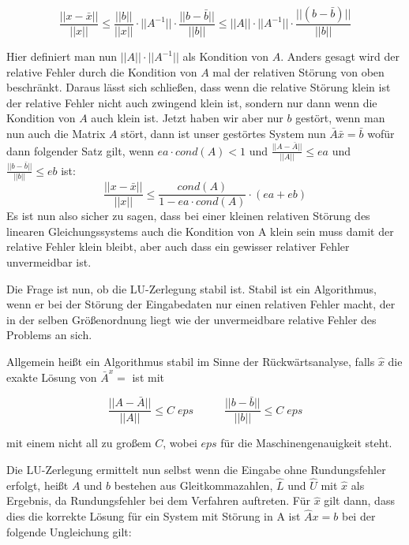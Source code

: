 \documentclass[course=erap]{aspdoc}
\begin{document}
\begin{equation}
\label{norm}
\frac{||x- \bar{x}||}{||x||}   \leq    \frac{||b||} {||x||} \cdot ||A^{-1}|| \cdot \frac{||b-\bar{b}||}{||b||} \leq ||A|| \cdot ||A^{-1}|| \cdot \frac{||(b-\bar{b})||} {||b||}
\end{equation}

 
Hier definiert man nun $||A|| \cdot ||A^{-1}||$ als Kondition von $A$. Anders gesagt wird 
der relative Fehler durch die Kondition von $A$ mal der relativen Störung 
von oben beschränkt. Daraus lässt sich schließen, dass wenn die relative Störung klein 
ist der relative Fehler nicht auch zwingend klein ist, sondern nur dann wenn die 
Kondition von $A$ auch klein ist.
Jetzt haben wir aber nur $b$ gestört, wenn man nun auch die Matrix $A$ stört, dann ist 
unser gestörtes System nun $\bar{A} \bar{x} = \bar{b}$ wofür dann folgender Satz gilt, wenn $ea \cdot cond(A) < 1$
 und $\frac{||A - \bar{A}||} {||A||} \leq ea $	und 	$\frac{||b - \bar{b}||} {||b||} \leq eb $ ist:\\
\begin{equation}
\frac{||x-\bar{x}||} {||x||} \leq \frac{cond(A)} {1- ea \cdot cond(A)} \cdot (ea + eb)   
\end{equation}
Es ist nun also sicher zu sagen, dass bei einer kleinen relativen Störung des linearen 
Gleichungssystems auch die Kondition von A klein sein muss damit der relative Fehler 
klein bleibt, aber auch dass ein gewisser relativer Fehler unvermeidbar ist.

Die Frage ist nun, ob die LU-Zerlegung stabil ist.
Stabil ist ein Algorithmus, wenn er bei der Störung der Eingabedaten nur einen relativen Fehler macht, 
der in der selben Größenordnung liegt wie der unvermeidbare relative Fehler des Problems an sich. 

Allgemein heißt ein Algorithmus stabil im Sinne der Rückwärtsanalyse, 
falls $\hat{x}$ die exakte Lösung von $\bar{A}^x =$ ist mit 							

 \begin{equation}
\label{norm}
\frac{|| A - \bar{A}||}{||A||} \leq C \; eps \;\; \;\;\;\;\;\;\;\;  \frac{|| b - \bar{b}||}{||b||} \leq C \; eps
\end{equation}

 mit einem nicht all zu großem $C$, wobei $eps$ für die Maschinengenauigkeit steht.

Die LU-Zerlegung ermittelt nun selbst wenn die Eingabe ohne 
Rundungsfehler erfolgt, heißt $A$ und $b$ bestehen aus Gleitkommazahlen, $\hat{L}$ und $\hat{U}$ mit 
$\hat{x}$ als Ergebnis, da Rundungsfehler bei dem Verfahren auftreten. Für $\hat{x}$ gilt 
dann, dass dies die korrekte Lösung für ein System mit Störung in A ist $\hat{A}x=b$ bei der 
folgende Ungleichung gilt:
\end{document}
